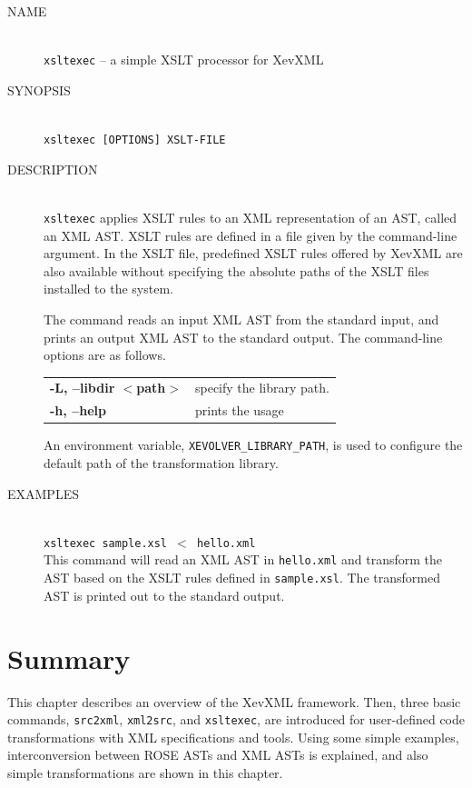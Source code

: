 \begin{framed}
\begin{description}
 \item[NAME]~\\
	    \texttt{xsltexec} -- a simple XSLT processor for XevXML

 \item[SYNOPSIS]~\\
	    \texttt{xsltexec [OPTIONS] XSLT-FILE}

 \item[DESCRIPTION]~\\ \texttt{xsltexec} applies XSLT rules to an XML
	    representation of an AST, called an XML AST. XSLT rules are
	    defined in a file given by the command-line argument. In the
	    XSLT file, predefined XSLT rules offered by XevXML are also
	    available without specifying the absolute paths of the XSLT
	    files installed to the system.

	    The command reads an input XML AST from the standard input,
	    and prints an output XML AST to the standard output. The
	    command-line options are as follows.

	    \begin{tabular}{ll}
	     {\bf -L, --libdir $<$path$>$} & specify the library path.\\
	     {\bf -h, --help} &  prints the usage\\
	    \end{tabular}

	    An environment variable, \texttt{XEVOLVER\_LIBRARY\_PATH},
	    is used to configure the default path of the transformation
	    library.
 \item[EXAMPLES]~\\ \texttt{xsltexec sample.xsl $<$ hello.xml}\\ This
	    command will read an XML AST in \texttt{hello.xml} and
	    transform the AST based on the XSLT rules defined in
	    \texttt{sample.xsl}. The transformed AST is printed out to
	    the standard output.
\end{description}
\end{framed}



\section{Summary}
This chapter describes an overview of the XevXML framework. Then, three
basic commands, \texttt{src2xml}, \texttt{xml2src}, and
\texttt{xsltexec}, are introduced for user-defined code transformations
with XML specifications and tools. Using some simple examples,
interconversion between ROSE ASTs and XML ASTs is explained, and also
simple transformations are shown in this chapter.

